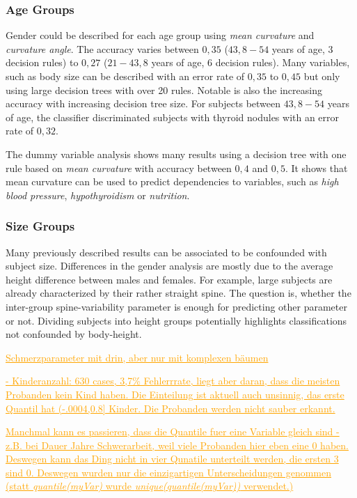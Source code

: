 \documentclass[a4paper,twoside]{style/article}
\newcommand{\com}[1]{\textcolor{orange}{\uline{#1}}}
\begin{document}
\subsubsection{Age Groups}
Gender could be described for each age group using \emph{mean curvature} and \emph{curvature angle}.
The accuracy varies between $0,35$ ($43,8-54$ years of age, 3 decision rules) to $0,27$ ($21-43,8$ years of age, 6 decision rules).
Many variables, such as body size can be described with an error rate of $0,35$ to $0,45$ but only using large decision trees with over 20 rules.
Notable is also the increasing accuracy with increasing decision tree size.
For subjects between $43,8-54$ years of age, the classifier discriminated subjects with thyroid nodules with an error rate of $0,32$.

The dummy variable analysis shows many results using a decision tree with one rule based on \emph{mean curvature} with accuracy between $0,4$ and $0,5$.
It shows that mean curvature can be used to predict dependencies to variables, such as \emph{high blood pressure}, \emph{hypothyroidism} or \emph{nutrition}.

\subsubsection{Size Groups}
Many previously described results can be associated to be confounded with subject size.
Differences in the gender analysis are mostly due to the average height difference between males and females.
For example, large subjects are already characterized by their rather straight spine.
%
The question is, whether the inter-group spine-variability parameter is enough for predicting other parameter or not.
Dividing subjects into height groups potentially highlights classifications not confounded by body-height.


\com{Schmerzparameter mit drin, aber nur mit komplexen bäumen}

\com{- Kinderanzahl: 630 cases, 3,7\% Fehlerrrate, liegt aber daran, dass die meisten Probanden kein Kind haben. Die Einteilung ist aktuell auch unsinnig, das erste Quantil hat (-.0004,0.8] Kinder. Die Probanden werden nicht sauber erkannt.}

\com{Manchmal kann es passieren, dass die Quantile fuer eine Variable gleich sind - z.B. bei Dauer Jahre Schwerarbeit, weil viele Probanden hier eben eine 0 haben. Deswegen kann das Ding nicht in vier Qunatile unterteilt werden, die ersten 3 sind 0. Deswegen wurden nur die einzigartigen Unterscheidungen genommen (statt \emph{quantile(myVar)} wurde \emph{unique(quantile(myVar))} verwendet.)}
\end{document}
